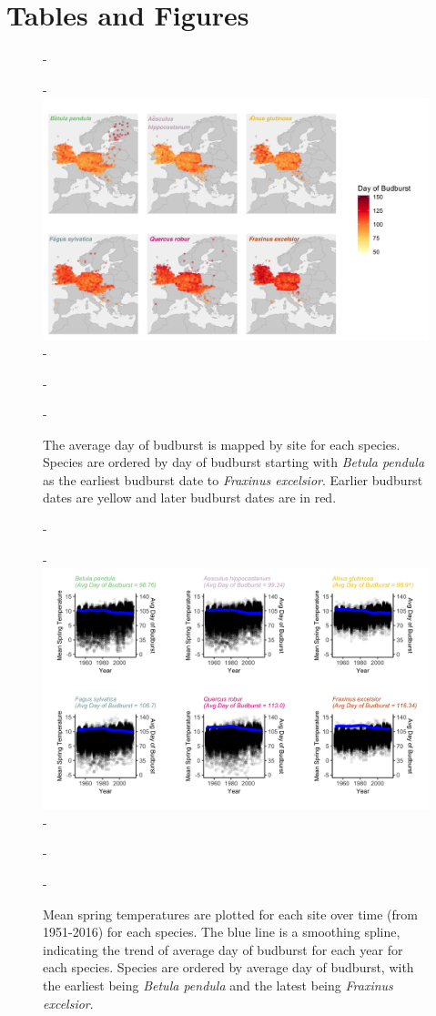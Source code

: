 \documentclass{article}\usepackage[]{graphicx}\usepackage[]{color}
\begin{document}


\section*{Tables and Figures} 

{\begin{figure} [H]
  -\begin{center}
  -\includegraphics[width=14cm]{..//figures/BB_base.png}
  -\caption{The average day of budburst is mapped by site for each species. Species are ordered by day of budburst starting with \textit{Betula pendula} as the earliest budburst date to \textit{Fraxinus excelsior}. Earlier budburst dates are yellow and later budburst dates are in red. }\label{fig:bbmap}
  -\end{center}
  -\end{figure}}
  
{\begin{figure} [H]
  -\begin{center}
  -\includegraphics[width=16cm]{..//figures/MSTBB_bySpp.png}
  -\caption{Mean spring temperatures are plotted for each site over time (from 1951-2016) for each species. The blue line is a smoothing spline, indicating the trend of average day of budburst for each year for each species. Species are ordered by average day of budburst, with the earliest being \textit{Betula pendula} and the latest being \textit{Fraxinus excelsior}. }\label{fig:mst}
  -\end{center}
  -\end{figure}}
  
\end{document}
